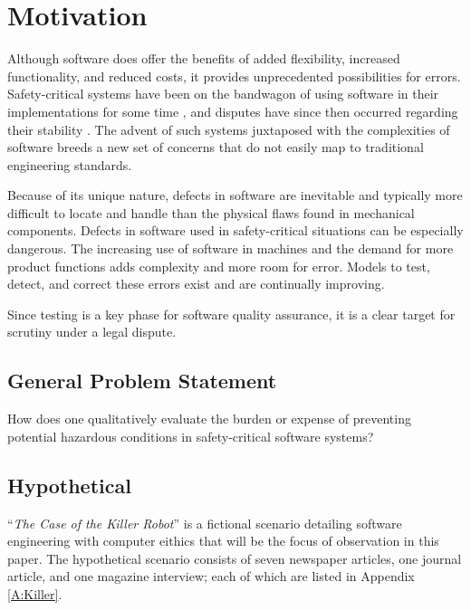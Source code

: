 \chapter{Motivation}

Although software does offer the benefits of added flexibility, increased
functionality, and reduced costs, it provides unprecedented possibilities for
errors. Safety-critical systems have been on the bandwagon of using software in
their implementations for some time \cite{Graupe78,Hurtig94}, and disputes have
since then occurred regarding their stability \cite{Leveson93,Maisel05}. The 
advent of such systems juxtaposed with the complexities of software breeds a new
set of concerns that do not easily map to traditional engineering standards.

Because of its unique nature, defects in software are inevitable and typically
more difficult to locate and handle than the physical flaws found in mechanical
components. Defects in software used in safety-critical situations can be
especially dangerous. The increasing use of software in machines and the demand
for more product functions adds complexity and more room for error. Models to
test, detect, and correct these errors exist and are continually improving.

Since testing is a key phase for software quality assurance, it is a clear
target for scrutiny under a legal dispute.

\section{General Problem Statement}
How does one qualitatively evaluate the burden or expense of preventing
potential hazardous conditions in safety-critical software systems?

\section{Hypothetical}
``\textit{The Case of the Killer Robot}'' \cite{Epstein96} is a fictional  
scenario detailing software engineering with computer eithics that will be the
focus of observation in this paper. The hypothetical scenario consists of seven
newspaper articles, one journal article, and one magazine interview; each of
which are listed in Appendix \ref{A:Killer}.
